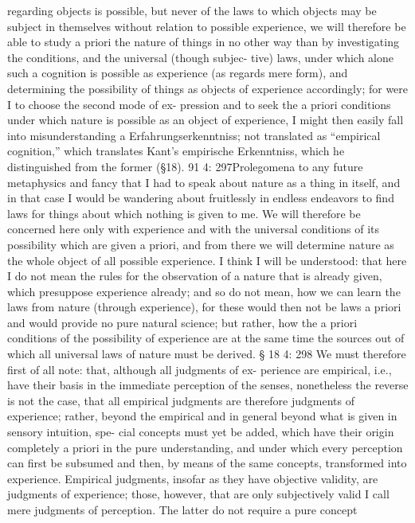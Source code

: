 regarding objects is possible, but never of the laws to which objects may
be subject in themselves without relation to possible experience, we will
therefore be able to study a priori the nature of things in no other way
than by investigating the conditions, and the universal (though subjec-
tive) laws, under which alone such a cognition is possible as experience (as
regards mere form), and determining the possibility of things as objects
of experience accordingly; for were I to choose the second mode of ex-
pression and to seek the a priori conditions under which nature is possible
as an object of experience, I might then easily fall into misunderstanding
a
Erfahrungserkenntniss; not translated as “empirical cognition,” which translates Kant’s
empirische Erkenntniss, which he distinguished from the former (§18).
91
4: 297Prolegomena to any future metaphysics
and fancy that I had to speak about nature as a thing in itself, and in that
case I would be wandering about fruitlessly in endless endeavors to ﬁnd
laws for things about which nothing is given to me.
We will therefore be concerned here only with experience and with
the universal conditions of its possibility which are given a priori, and
from there we will determine nature as the whole object of all possible
experience. I think I will be understood: that here I do not mean the rules
for the observation of a nature that is already given, which presuppose
experience already; and so do not mean, how we can learn the laws from
nature (through experience), for these would then not be laws a priori
and would provide no pure natural science; but rather, how the a priori
conditions of the possibility of experience are at the same time the sources
out of which all universal laws of nature must be derived.
§ 18
4: 298
We must therefore ﬁrst of all note: that, although all judgments of ex-
perience are empirical, i.e., have their basis in the immediate perception
of the senses, nonetheless the reverse is not the case, that all empirical
judgments are therefore judgments of experience; rather, beyond the
empirical and in general beyond what is given in sensory intuition, spe-
cial concepts must yet be added, which have their origin completely a
priori in the pure understanding, and under which every perception can
ﬁrst be subsumed and then, by means of the same concepts, transformed
into experience.
Empirical judgments, insofar as they have objective validity, are judgments
of experience; those, however, that are only subjectively valid I call mere
judgments of perception. The latter do not require a pure concept
